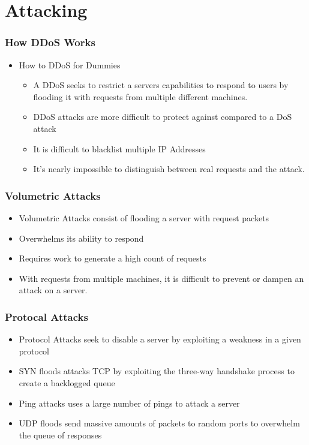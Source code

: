 \documentclass{beamer}
\begin{document}
\section{Attacking}

\begin{frame}
    \frametitle{How DDoS Works}
    \begin{itemize}
        \item How to DDoS for Dummies
            \begin{itemize}
                \item<+-> A DDoS seeks to restrict a servers capabilities to respond to users by flooding it with requests from multiple different machines.
                \item<+-> DDoS attacks are more difficult to protect against compared to a DoS attack
                \item<+-> It is difficult to blacklist multiple IP Addresses
                \item<+-> It's nearly impossible to distinguish between real requests and the attack.
            \end{itemize}
    \end{itemize}
\end{frame}

\begin{frame}
    \frametitle{Volumetric Attacks}
        \begin{itemize}
            \item<+-> Volumetric Attacks consist of flooding a server with request packets
            \item<+-> Overwhelms its ability to respond
            \item<+-> Requires work to generate a high count of requests
            \item<+-> With requests from multiple machines, it is difficult to prevent or dampen an attack on a server.
    \end{itemize}
\end{frame}
\begin{frame}
    \frametitle{Protocal Attacks}
     \begin{itemize}
            \item<+-> Protocol Attacks seek to disable a server by exploiting a weakness in a given protocol
            \item<+-> SYN floods attacks TCP by exploiting the three-way handshake process to create a backlogged queue
            \item<+-> Ping attacks uses a large number of pings to attack a server
            \item<+-> UDP floods send massive amounts of packets to random ports to overwhelm the queue of responses
        \end{itemize}
\end{frame}
\end{document}
